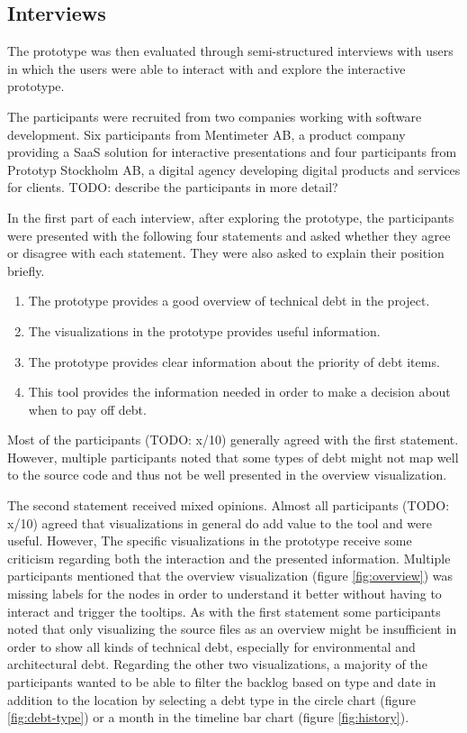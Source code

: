 \subsection{Interviews}

The prototype was then evaluated through semi-structured interviews with users in which the users were able to interact with and explore the interactive prototype.

The participants were recruited from two companies working with software development.
Six participants from Mentimeter AB, a product company providing a SaaS solution for interactive presentations and four participants from Prototyp Stockholm AB, a digital agency developing digital products and services for clients. TODO: describe the participants in more detail?

In the first part of each interview, after exploring the prototype, the participants were presented with the following four statements and asked whether they agree or disagree with each statement.
They were also asked to explain their position briefly.

\smallskip
\begin{enumerate}
  \item The prototype provides a good overview of technical debt in the project.
  \item The visualizations in the prototype provides useful information.
  \item The prototype provides clear information about the priority of debt items.
  \item This tool provides the information needed in order to make a decision about when to pay off debt.
\end{enumerate}
\smallskip

Most of the participants (TODO: x/10) generally agreed with the first statement.
However, multiple participants noted that some types of debt might not map well to the source code and thus not be well presented in the overview visualization.

The second statement received mixed opinions.
Almost all participants (TODO: x/10) agreed that visualizations in general do add value to the tool and were useful.
However, The specific visualizations in the prototype receive some criticism regarding both the interaction and the presented information. 
Multiple participants mentioned that the overview visualization (figure \ref{fig:overview}) was missing labels for the nodes in order to understand it better without having to interact and trigger the tooltips.
As with the first statement some participants noted that only visualizing the source files as an overview might be insufficient in order to show all kinds of technical debt, especially for environmental and architectural debt.
Regarding the other two visualizations, a majority of the participants wanted to be able to filter the backlog based on type and date in addition to the location by selecting a debt type in the circle chart (figure \ref{fig:debt-type}) or a month in the timeline bar chart (figure \ref{fig:history}).

